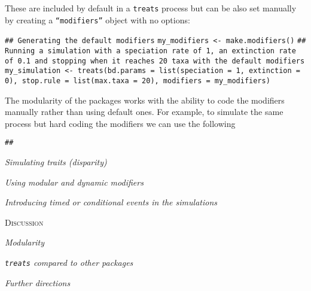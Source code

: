 \documentclass[12pt,letterpaper]{article}
\renewcommand{\section}[1]{%
\bigskip
\begin{center}
\begin{Large}
\normalfont\scshape #1
\medskip
\end{Large}
\end{center}}
\renewcommand{\subsection}[1]{%
\bigskip
\begin{center}
\begin{large}
\normalfont\itshape #1
\end{large}
\end{center}}
\newcommand{\treats}{\texttt{treats} }
\begin{document}
These are included by default in a \texttt{treats} process but can be also set manually by creating a \texttt{``modifiers''} object with no options:

\texttt{## Generating the default modifiers}
\texttt{my_modifiers <- make.modifiers()}
\texttt{## Running a simulation with a speciation rate of 1, an extinction rate of 0.1 and stopping when it reaches 20 taxa with the default modifiers}
\texttt{my_simulation <- treats(bd.params = list(speciation = 1, extinction = 0), stop.rule = list(max.taxa = 20), modifiers = my_modifiers)}

The modularity of the packages works with the ability to code the modifiers manually rather than using default ones.
For example, to simulate the same process but hard coding the modifiers we can use the following

\texttt{## }


\subsection{Simulating traits (disparity)}


\subsection{Using modular and dynamic modifiers}


\subsection{Introducing timed or conditional events in the simulations}


\section{Discussion}

\subsection{Modularity}

\subsection{\treats compared to other packages}

\subsection{Further directions}
\end{document}
